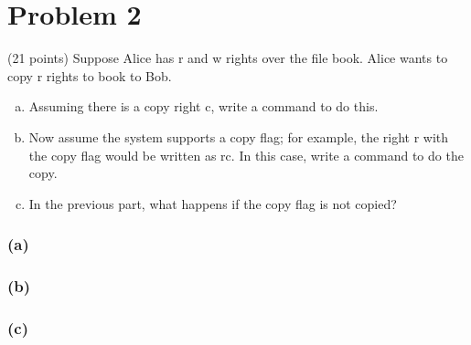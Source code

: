 \section*{Problem 2}
(21 points) Suppose Alice has r and w rights over the file book. Alice wants to copy r rights to book to Bob.
\begin{enumerate}[(a)]
    \item Assuming there is a copy right c, write a command to do this.
    \item Now assume the system supports a copy flag; for example, the right r with the copy flag would be written as rc. In this case, write a command to do the copy.
    \item In the previous part, what happens if the copy flag is not copied?
\end{enumerate}

\subsubsection*{(a)}
\subsubsection*{(b)}
\subsubsection*{(c)}





